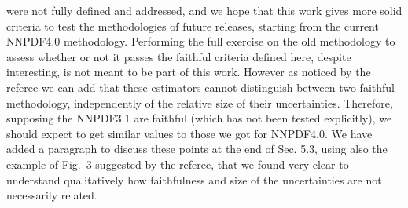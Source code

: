 \documentclass[11pt,a4paper]{article}
\numberwithin{equation}{section}
\numberwithin{figure}{section}
\numberwithin{table}{section}
\begin{document}
\begin{enumerate}
    were not fully defined and addressed, and we hope that this work gives more solid criteria 
    to test the methodologies of future releases, starting from the current NNPDF4.0 methodology.
    Performing the full exercise on the old methodology to assess whether or not it passes the faithful
    criteria defined here, despite interesting, is not meant to be part of this work.
    However as noticed by the referee we can add that these estimators cannot distinguish 
    between two faithful methodology, independently of the relative size of their uncertainties.
    Therefore, supposing the NNPDF3.1 are faithful (which has not been tested explicitly),
    we should expect to get similar values to those we got for NNPDF4.0.
    We have added a paragraph to discuss these points at the end of Sec. 5.3, using also the example of Fig.~3 suggested by the referee,
    that we found very clear to understand qualitatively how faithfulness and size of the uncertainties are 
    not necessarily related. 



\end{enumerate}
\end{document}
